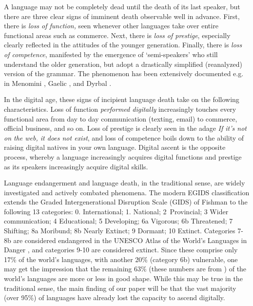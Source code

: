 \documentclass[10pt]{article}
\begin{document}
A language may not be completely dead until the death of its last speaker, but
there are three clear signs of imminent death observable well in advance.
First, there is {\it loss of function,} seen whenever other languages take
over entire functional areas such as commerce. Next, there is {\it loss of
  prestige}, especially clearly reflected in the attitudes of the younger
generation. Finally, there is {\it loss of competence}, manifested by the
emergence of `semi-speakers' who still understand the older generation, but
adopt a drastically simplified (reanalyzed) version of the grammar.  The
phenomenon has been extensively documented e.g. in Menomini \cite{Bloomfield:1927},
Gaelic \cite{Dorian:1981},
and Dyrbal \cite{Schmidt:1985}.

In the digital age, these signs of incipient language death take on the
following characteristics. Loss of function {\it performed digitally}
increasingly touches every functional area from day to day communication
(texting, email) to commerce, official business, and so on.  Loss of prestige
is clearly seen in the adage {\it If it's not on the web, it does not exist},
and loss of competence boils down to the ability of raising digital natives
\cite{Prensky:2001} in your own language. {\color{black} Digital ascent is the
  opposite process, whereby a language increasingly acquires digital functions
  and prestige as its speakers increasingly acquire digital skills.} 


Language endangerment and language death, in the traditional sense, are widely
investigated and actively combated phenomena. The modern EGIDS classification
\cite{Lewis:2010} extends the Graded Intergenerational Disruption Scale
(GIDS) of Fishman \cite{Fishman:1991} to the following 13 categories: 0. International;
1. National; 2~Provincial; 3 Wider communication; 4 Educational; 5 Developing;
6a Vigorous; 6b Threatened; 7 Shifting; 8a Moribund; 8b Nearly Extinct; 9
Dormant; 10 Extinct. Categories 7-8b are considered endangered in the UNESCO
Atlas of the World's Languages in Danger \cite{Mosley:2010}, and categories 9-10 are
considered extinct. Since these comprise only 17\% of the world's languages,
with another 20\% (category 6b) vulnerable, one may get the impression that
the remaining 63\% (these numbers are from \cite{Simons:2013}) of the
world's languages are more or less in good shape. While this may be true in
the traditional sense, the main finding of our paper will be that the
{\color{black} vast majority (over 95\%) of languages have already lost the
  capacity to ascend digitally.}
\end{document}
